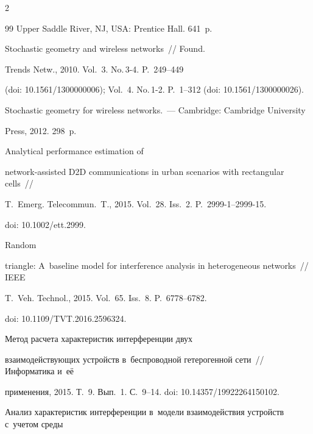 \begin{multicols}{2}
{{\begin{thebibliography}{99}
Upper Saddle River, NJ, USA: Prentice Hall. 641~p.




 Stochastic geometry and wireless networks~// Found. 


Trends Netw., 2010. Vol.~3. No.\,3-4. P.~249--449


(doi: 10.1561/1300000006); Vol.~4. No.\,1-2. P.~1--312 (doi: 10.1561/1300000026).







 Stochastic geometry for wireless networks.~--- Cambridge: Cambridge University 


Press, 2012. 298~p.




 Analytical performance estimation of  


network-assisted D2D communications in urban scenarios with rectangular cells~// 


T.~Emerg. Telecommun.~T., 2015. Vol.~28. Iss.~2. P.~2999-1--2999-15.


doi: 10.1002/ett.2999.




 Random 


triangle: A~baseline model for interference analysis in heterogeneous networks~// IEEE 


T.~Veh. Technol., 2015. Vol.~65. Iss.~8. P.~6778--6782.


doi: 10.1109/TVT.2016.2596324.




 Метод расчета характеристик интерференции двух 


взаимо\-дей\-ст\-ву\-ющих устройств в~беспроводной гетерогенной сети~// Информатика и~её 


применения, 2015. Т.~9. Вып.~1. С.~9--14. doi: 10.14357/19922264150102.






Анализ характеристик интерференции в~модели взаимодействия устройств с~учетом среды 



\end{thebibliography}}}
\end{multicols}
